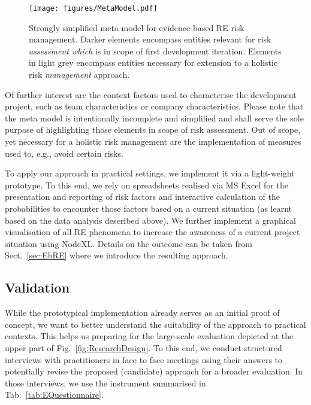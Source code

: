 \documentclass[lnbip]{svmultln}
\begin{document}
\begin{figure}[!hbtp]
\centering
  \texttt{[image: figures/MetaModel.pdf]}\\
  \caption{Strongly simplified meta model for evidence-based RE risk management. Darker elements encompass entities relevant for risk \emph{assessment which} is in scope of first development iteration. Elements in light grey encompass entities necessary for extension to a holistic risk \emph{management} approach.}
  \label{fig:MetaModel}
\end{figure} 
Of further interest are the context factors used to characterise the development project, such as team characteristics or company characteristics. Please note that the meta model is intentionally incomplete and simplified and shall serve the sole purpose of highlighting those elements in scope of risk assessment. Out of scope, yet necessary for a holistic risk management are the implementation of measures used to, e.g., avoid certain risks.

To apply our approach in practical settings, we implement it via a light-weight prototype. To this end, we rely on spreadsheets realised via MS Excel for the presentation and reporting of risk factors and interactive calculation of the probabilities to encounter those factors based on a current situation (as learnt based on the data analysis described above). We further implement a graphical visualisation of all RE phenomena to increase the awareness of a current project situation using NodeXL. Details on the outcome can be taken from Sect.~\ref{sec:EbRE} where we introduce the resulting approach. 

\subsection{Validation}
\label{sec:ValidationDesign}
While the prototypical implementation already serves as an initial proof of concept, we want to better understand the suitability of the approach to practical contexts. This helps us preparing for the large-scale evaluation depicted at the upper part of Fig.~\ref{fig:ResearchDesign}. To this end, we conduct structured interviews with practitioners in face to face meetings using their answers to potentially revise the proposed (candidate) approach for a broader evaluation. In those interviews, we use the instrument summarised in Tab.~\ref{tab:EQuestionnaire}. 
\end{document}
